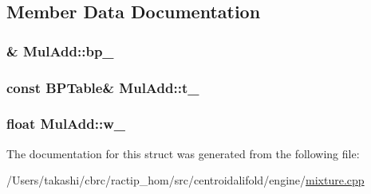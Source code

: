 \subsection{Member Data Documentation}
\hypertarget{struct_mul_add_a79aba94efccf5784e5f2a7481c4e7877}{
\subsubsection[{bp\+\_\+}]{\& Mul\+Add\+::bp\+\_\+}}\label{struct_mul_add_a79aba94efccf5784e5f2a7481c4e7877}
\hypertarget{struct_mul_add_a3dc017d7e72df73b290feedbd90b6696}{
\subsubsection[{t\+\_\+}]{\setlength{\rightskip}{0pt plus 5cm}const {\bf B\+P\+Table}\& Mul\+Add\+::t\+\_\+}}\label{struct_mul_add_a3dc017d7e72df73b290feedbd90b6696}
\hypertarget{struct_mul_add_a276a4503f05e81c57f9e668d792a9b90}{
\subsubsection[{w\+\_\+}]{\setlength{\rightskip}{0pt plus 5cm}float Mul\+Add\+::w\+\_\+}}\label{struct_mul_add_a276a4503f05e81c57f9e668d792a9b90}


The documentation for this struct was generated from the following file\+:\begin{DoxyCompactItemize}
\item 
/\+Users/takashi/cbrc/ractip\+\_\+hom/src/centroidalifold/engine/\hyperlink{mixture_8cpp}{mixture.\+cpp}\end{DoxyCompactItemize}
